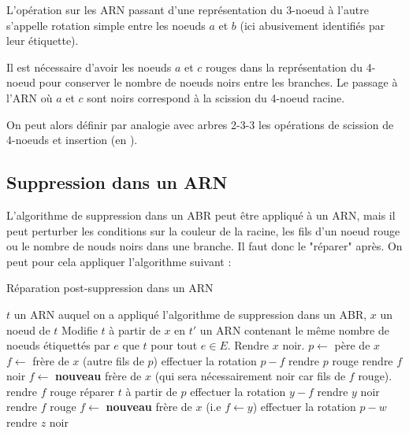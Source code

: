 \documentclass{scrartcl}
\begin{document}
			\rem L'opération sur les ARN passant d'une représentation du 3-noeud à l'autre s'appelle rotation simple entre les noeuds $a$ et $b$ (ici abusivement identifiés par leur étiquette).

			\rem Il est nécessaire d'avoir les noeuds $a$ et $c$ rouges dans la représentation du 4-noeud pour conserver le nombre de noeuds noirs entre les branches.
				Le passage à l'ARN où $a$ et $c$ sont noirs correspond à la scission du 4-noeud racine.

			On peut alors définir par analogie avec arbres 2-3-3 les opérations de scission de 4-noeuds et insertion (en \exercice).

		\subsection{Suppression dans un ARN}
			L'algorithme de suppression dans un ABR peut être appliqué à un ARN, mais il peut perturber les conditions sur la couleur de la racine, les fils d'un noeud rouge ou le nombre de nouds noirs dans une branche. Il faut donc le "réparer" après. On peut pour cela appliquer l'algorithme suivant :

			\begin{algorithm}[H]
				\caption{Réparation post-suppression dans un ARN}
				\Entree
				{
					$t$ un ARN auquel on a appliqué l'algorithme de suppression dans un ABR,
					$x$ un noeud de $t$
				}
				\Sortie
				{
					Modifie $t$ à partir de $x$ en $t'$ un ARN contenant le même nombre de noeuds étiquettés par $e$ que $t$ pour tout $e \in E$.
				}
				{
					Rendre $x$ noir.
				}
				{
					{
						$p \leftarrow$ père de $x$ \;
						$f \leftarrow$ frère de $x$ (autre fils de $p$) \;
						{
							effectuer la rotation $p-f$ \;
							rendre $p$ rouge \;
							rendre $f$ noir
							$f \leftarrow$ \textbf{nouveau} frère de $x$ (qui sera nécessairement noir car fils de $f$ rouge).
						}
						{
							rendre $f$ rouge \;
							réparer $t$ à partir de $p$
						}
						{
							{
								effectuer la rotation $y-f$ \;
								rendre $y$ noir \;
								rendre $f$ rouge \;
								$f \leftarrow$ \textbf{nouveau} frère de $x$ (i.e $f \leftarrow y$)
							}
							{
								effectuer la rotation $p-w$ \;
								rendre $z$ noir
							}
						}
					}
				}
			\end{algorithm}
\end{document}

